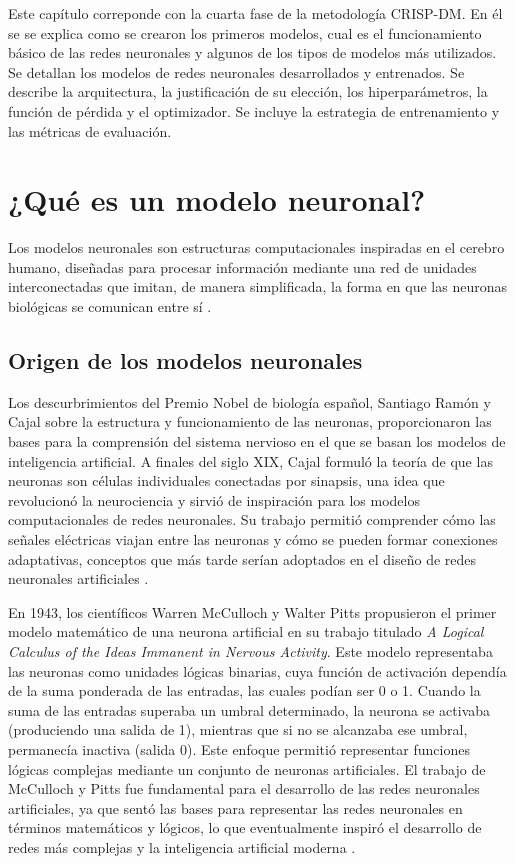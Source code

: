 
Este capítulo correponde con la cuarta fase de la metodología CRISP-DM. En él se se explica como se crearon los primeros modelos, cual es el funcionamiento básico de las redes neuronales y algunos de los tipos de modelos más utilizados. Se detallan los modelos de redes neuronales desarrollados y entrenados. Se describe la arquitectura, la justificación de su elección, los hiperparámetros, la función de pérdida y el optimizador. Se incluye la estrategia de entrenamiento y las métricas de evaluación.

\section{¿Qué es un modelo neuronal?}


Los modelos neuronales son estructuras computacionales inspiradas en el cerebro humano, diseñadas para procesar información mediante una red de unidades interconectadas que imitan, de manera simplificada, la forma en que las neuronas biológicas se comunican entre sí \cite{goodfellow2016deep}.

\subsection{Origen de los modelos neuronales}
Los descurbrimientos del Premio Nobel de biología español, Santiago Ramón y Cajal sobre la estructura y funcionamiento de las neuronas, proporcionaron las bases para la comprensión del sistema nervioso en el que se basan los modelos de inteligencia artificial. A finales del siglo XIX, Cajal formuló la teoría de que las neuronas son células individuales conectadas por sinapsis, una idea que revolucionó la neurociencia y sirvió de inspiración para los modelos computacionales de redes neuronales. Su trabajo permitió comprender cómo las señales eléctricas viajan entre las neuronas y cómo se pueden formar conexiones adaptativas, conceptos que más tarde serían adoptados en el diseño de redes neuronales artificiales \cite{leCun2015}.


En 1943, los científicos Warren McCulloch y Walter Pitts propusieron el primer modelo matemático de una neurona artificial en su trabajo titulado \textit{A Logical Calculus of the Ideas Immanent in Nervous Activity}. Este modelo representaba las neuronas como unidades lógicas binarias, cuya función de activación dependía de la suma ponderada de las entradas, las cuales podían ser 0 o 1. Cuando la suma de las entradas superaba un umbral determinado, la neurona se activaba (produciendo una salida de 1), mientras que si no se alcanzaba ese umbral, permanecía inactiva (salida 0). Este enfoque permitió representar funciones lógicas complejas mediante un conjunto de neuronas artificiales. El trabajo de McCulloch y Pitts fue fundamental para el desarrollo de las redes neuronales artificiales, ya que sentó las bases para representar las redes neuronales en términos matemáticos y lógicos, lo que eventualmente inspiró el desarrollo de redes más complejas y la inteligencia artificial moderna \cite{mcculloch1943logical}.


